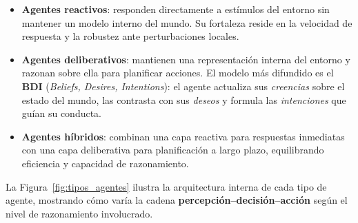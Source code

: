 \begin{itemize}
    \item \textbf{Agentes reactivos}: responden directamente a estímulos del entorno sin mantener un modelo interno del mundo. Su fortaleza reside en la velocidad de respuesta y la robustez ante perturbaciones locales.
    \item \textbf{Agentes deliberativos}: mantienen una representación interna del entorno y razonan sobre ella para planificar acciones. El modelo más difundido es el \textbf{BDI} (\textit{Beliefs, Desires, Intentions}): el agente actualiza sus \textit{creencias} sobre el estado del mundo, las contrasta con sus \textit{deseos} y formula las \textit{intenciones} que guían su conducta.
    \item \textbf{Agentes híbridos}: combinan una capa reactiva para respuestas inmediatas con una capa deliberativa para planificación a largo plazo, equilibrando eficiencia y capacidad de razonamiento.
\end{itemize}

La Figura~\ref{fig:tipos_agentes} ilustra la arquitectura interna de cada tipo de agente, mostrando cómo varía la cadena \textbf{percepción--decisión--acción} según el nivel de razonamiento involucrado.


